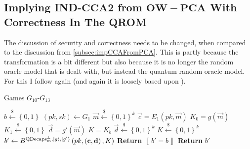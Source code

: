 \subsection{Implying IND-$\mathbf{CCA2}$ from $\mathbf{OW-PCA}$ With Correctness In The QROM}
\label{subsec:impCCAFroOWPCAWitCorInTheQROM}

The discussion of security and correctness needs to be changed, when compared to the discussion from \cref{subsec:impCCAFromPCA}. This is partly because the transformation is a bit different but also because it is no longer the random oracle model that is dealt with, but instead the quantum random oracle model. For this I follow \cite{HHK} again (and again it is loosely based upon \cite{TU}).

\begin{center}
\begin{minipage}[ht!]{0.7\textwidth}
	\begin{algorithm}[H]
		\centering
		\caption{Games $G_{10}$-$G_{13}$}
		\label{alg:G10toG13}
		\begin{algorithmic}
			\State $b \xleftarrow{\$} \left\{ 0,1 \right\}$ 
			\State $\left(pk,sk\right) \leftarrow G_1$
			\State $\vec{m} \xleftarrow{\$} \left\{ 0,1 \right\}^k$
			\State $\vec{c} = E_1\left(pk, \vec{m}\right)$
			\State $K_0 = g\left(\vec{m}\right)$
			\State $K_1 \xleftarrow{\$} \left\{ 0,1 \right\}$
			\State $\vec{d} = g'\left(\vec{m}\right)$ 
			\State $K = K_b$ 
			\State $\vec{d} \xleftarrow{\$} \left\{ 0,1 \right\}^k$ 
			\State $K \xleftarrow{\$} \left\{ 0,1 \right\}^k$ 
			\State $b' \leftarrow B^{\mathrm{QDecaps}^{\bot}_m, \lvert g\rangle, \lvert g'\rangle}\left(pk, \left(\boldsymbol{\mathrm{c}}, \boldsymbol{\mathrm{d}}\right), K\right)$
			\State \textbf{Return} $\left\llbracket b' = b \right\rrbracket$ 
			\State \textbf{Return} $b'$ 
		\end{algorithmic}
	\end{algorithm}
\end{minipage}
\end{center}
